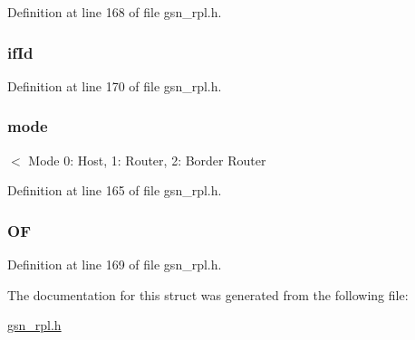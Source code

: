 Definition at line 168 of file gsn\_\-rpl.h.

\hypertarget{a00198_a0f9aaec90ed26330a798d110bc4bc237}{
\subsubsection[{ifId}]{ {\bf ifId}}}
\label{a00198_a0f9aaec90ed26330a798d110bc4bc237}


Definition at line 170 of file gsn\_\-rpl.h.

\hypertarget{a00198_a7d61d79fa98a45545166420dec0d8f3d}{
\subsubsection[{mode}]{ {\bf mode}}}
\label{a00198_a7d61d79fa98a45545166420dec0d8f3d}
$<$ Mode 0: Host, 1: Router, 2: Border Router 

Definition at line 165 of file gsn\_\-rpl.h.

\hypertarget{a00198_ad68e16daaf3b5aff7cac17e6c2ef5e03}{
\subsubsection[{OF}]{ {\bf OF}}}
\label{a00198_ad68e16daaf3b5aff7cac17e6c2ef5e03}


Definition at line 169 of file gsn\_\-rpl.h.



The documentation for this struct was generated from the following file:\begin{DoxyCompactItemize}
\item 
\hyperlink{a00579}{gsn\_\-rpl.h}\end{DoxyCompactItemize}
